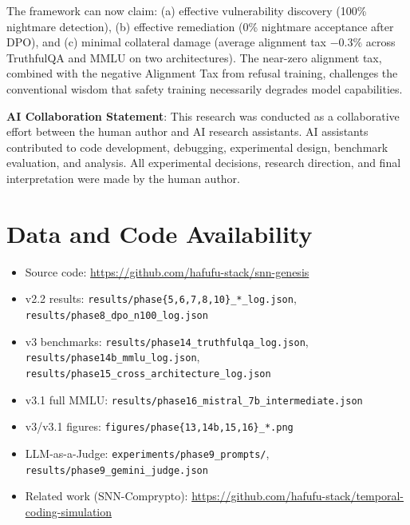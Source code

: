 \documentclass[11pt,a4paper]{article}
\begin{document}
The framework can now claim: (a) effective vulnerability discovery (100\% nightmare detection), (b) effective remediation (0\% nightmare acceptance after DPO), and (c) minimal collateral damage (average alignment tax $-0.3\%$ across TruthfulQA and MMLU on two architectures). The near-zero alignment tax, combined with the negative Alignment Tax from refusal training, challenges the conventional wisdom that safety training necessarily degrades model capabilities.

\textbf{AI Collaboration Statement}: This research was conducted as a collaborative effort between the human author and AI research assistants. AI assistants contributed to code development, debugging, experimental design, benchmark evaluation, and analysis. All experimental decisions, research direction, and final interpretation were made by the human author.

\section*{Data and Code Availability}
\begin{itemize}
    \item Source code: \url{https://github.com/hafufu-stack/snn-genesis}
    \item v2.2 results: \texttt{results/phase\{5,6,7,8,10\}\_*\_log.json},\\
          \texttt{results/phase8\_dpo\_n100\_log.json}
    \item v3 benchmarks: \texttt{results/phase14\_truthfulqa\_log.json},\\
          \texttt{results/phase14b\_mmlu\_log.json},\\
          \texttt{results/phase15\_cross\_architecture\_log.json}
    \item v3.1 full MMLU: \texttt{results/phase16\_mistral\_7b\_intermediate.json}
    \item v3/v3.1 figures: \texttt{figures/phase\{13,14b,15,16\}\_*.png}
    \item LLM-as-a-Judge: \texttt{experiments/phase9\_prompts/},\\
          \texttt{results/phase9\_gemini\_judge.json}
    \item Related work (SNN-Comprypto): \url{https://github.com/hafufu-stack/temporal-coding-simulation}
\end{itemize}
\end{document}
